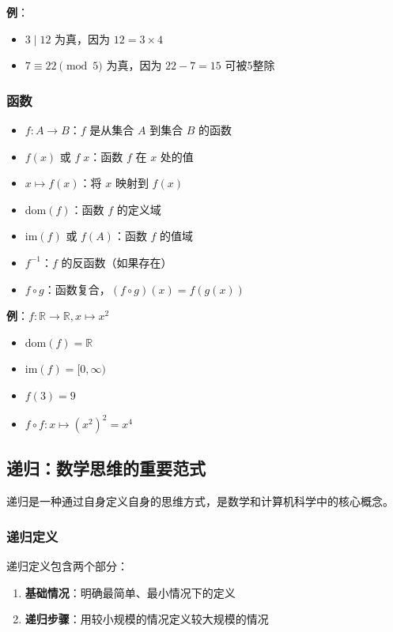 \documentclass[12pt,a4paper,UTF8]{ctexart}
\begin{document}
\textbf{例}：
\begin{itemize}
    \item $3 \mid 12$ 为真，因为 $12 = 3 \times 4$
    \item $7 \equiv 22 \pmod{5}$ 为真，因为 $22-7=15$ 可被5整除
\end{itemize}

\subsubsection{函数}

\begin{itemize}
    \item $f: A \to B$：$f$ 是从集合 $A$ 到集合 $B$ 的函数
    \item $f(x)$ 或 $f\;x$：函数 $f$ 在 $x$ 处的值
    \item $x \mapsto f(x)$：将 $x$ 映射到 $f(x)$
    \item $\mathrm{dom}(f)$：函数 $f$ 的定义域
    \item $\mathrm{im}(f)$ 或 $f(A)$：函数 $f$ 的值域
    \item $f^{-1}$：$f$ 的反函数（如果存在）
    \item $f \circ g$：函数复合，$(f \circ g)(x) = f(g(x))$
\end{itemize}

\textbf{例}：$f: \mathbb{R} \to \mathbb{R}, x \mapsto x^2$
\begin{itemize}
    \item $\mathrm{dom}(f) = \mathbb{R}$
    \item $\mathrm{im}(f) = [0, \infty)$
    \item $f(3) = 9$
    \item $f \circ f: x \mapsto (x^2)^2 = x^4$
\end{itemize}

\subsection{递归：数学思维的重要范式}

递归是一种通过自身定义自身的思维方式，是数学和计算机科学中的核心概念。

\subsubsection{递归定义}

递归定义包含两个部分：
\begin{enumerate}
    \item \textbf{基础情况}：明确最简单、最小情况下的定义
    \item \textbf{递归步骤}：用较小规模的情况定义较大规模的情况
\end{enumerate}
\end{document}
